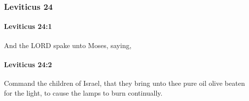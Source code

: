 	\subsubsection{Leviticus 24} %
		\label{LEVITICUS-24}

		\paragraph{Leviticus 24:1} %
			\label{LEVITICUS-24-1}

			And the LORD spake unto Moses, saying,


		\paragraph{Leviticus 24:2} %
			\label{LEVITICUS-24-2}

			Command the children of Israel, that they bring unto thee pure oil olive beaten for the light, to cause the lamps to burn continually.

